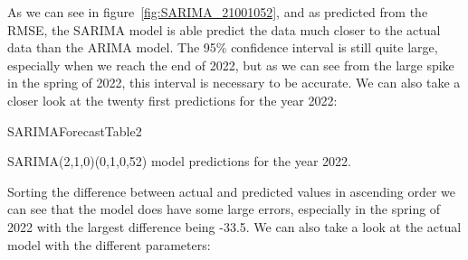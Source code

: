 As we can see in figure~\ref{fig:SARIMA_21001052}, and as predicted from the RMSE, the SARIMA model is able predict the data much closer to the actual data than the ARIMA model. The 95\% confidence interval is still quite large, especially when we reach the end of 2022, but as we can see from the large spike in the spring of 2022, this interval is necessary to be accurate. We can also take a closer look at the twenty first predictions for the year 2022:
\begin{table}[H]
    \begin{center}
        {SARIMAForecastTable2}
        \caption{SARIMA(2,1,0)(0,1,0,52) model predictions for the year 2022.}\label{tab:SARIMA_forecast}
    \end{center}
\end{table}
Sorting the difference between actual and predicted values in ascending order we can see that the model does have some large errors, especially in the spring of 2022 with the largest difference being -33.5. We can also take a look at the actual model with the different parameters:

